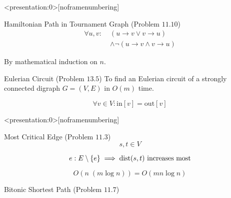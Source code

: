 
\begin{frame}<presentation:0>[noframenumbering]
  \begin{exampleblock}{Hamiltonian Path in Tournament Graph (Problem $11.10$)}
    \begin{align*}
      \forall u, v:\; &(u \to v \lor v \to u) \\
	    &\land \lnot (u \to v \land v \to u)
    \end{align*}
  \end{exampleblock}

  \pause
  \vspace{0.60cm}
  \centerline{By mathematical induction on $n$.}
\end{frame}

\begin{frame}{}
  \begin{exampleblock}{Eulerian Circuit (Problem $13.5$)}
    To find an Eulerian circuit of a strongly connected digraph $G = (V, E)$ in $O(m)$ time. 
  \end{exampleblock}

  \pause
  \[
    \forall v \in V: \text{in}[v] = \text{out}[v]
  \]

  \pause
\end{frame}

\begin{frame}{}
  

  \pause
  \vspace{0.20cm}
  \centerline{}
\end{frame}

\begin{frame}<presentation:0>[noframenumbering]
  \begin{exampleblock}{Most Critical Edge (Problem $11.3$)}
    \[
      s, t \in V
    \]

    \[
      e: E \setminus \{e\} \implies \text{dist}(s,t) \text{ increases most}
    \]
  \end{exampleblock}

  \pause
  \vspace{0.30cm}

  \pause
  \[
    O(n \; (m \log n)) = O(mn \log n)
  \]
\end{frame}

\begin{frame}{}
  \begin{exampleblock}{Bitonic Shortest Path (Problem $11.7$)}
  \end{exampleblock}

  \pause
  \vspace{0.30cm}
\end{frame}
